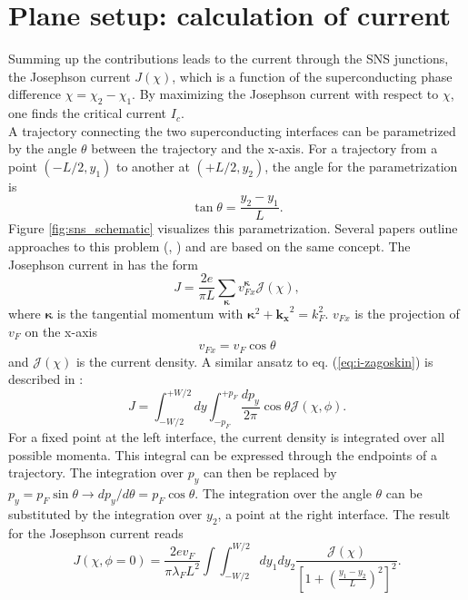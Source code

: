 \section{Plane setup: calculation of current}
Summing up the contributions leads to the current through the SNS junctions, the Josephson current $J\left( \chi \right)$, which is a function of the superconducting phase difference $\chi = \chi_2 - \chi_1$. By maximizing the Josephson current with respect to $\chi$, one finds the critical current $I_c$.\\
A trajectory connecting the two superconducting interfaces can be parametrized by the angle $\theta$ between the trajectory and the x-axis. For a trajectory from a point $(-L/2, y_1)$ to another at $(+L/2, y_2)$, the angle for the parametrization is
\begin{equation}
\tan \theta = \frac{y_2 - y_1}{L}.
\label{eq:parametrization}
\end{equation}
Figure \ref{fig:sns_schematic} visualizes this parametrization. 
Several papers outline approaches to this problem (\cite{Zagoskin1997}, \cite{Barzykin1999}) and are based on the same concept. The Josephson current in \cite{Zagoskin1997} has the form
\begin{equation}
J =  \frac{2 e }{\pi L} \sum_{\bm{\kappa}}v^{\bm{\kappa}}_{Fx} \mathcal{J} \left(\chi\right), \label{eq:i-zagoskin}
\end{equation}
where $\bm{\kappa}$ is the tangential momentum with $\bm{\kappa}^2 + \mathbf{k_x}^2 = k_F^2$.
$v_{Fx}$ is the projection of $v_F$ on the x-axis
\begin{equation}
v_{Fx} =  v_F  \cos \theta
\end{equation}
and $\mathcal{J} \left( \chi \right)$ is the current density. A similar ansatz to eq. (\ref{eq:i-zagoskin}) is described in \cite{Meier2016}:
\begin{equation}
J =  \int_{-W/2}^{+W/2} dy \int_{-p_F}^{+p_F} \frac{dp_y}{2 \pi} \cos \theta \mathcal{J} \left( \chi, \phi \right).
\end{equation}
For a fixed point at the left interface, the current density is integrated over all possible momenta. This integral can be expressed through the endpoints of a trajectory. The integration over $p_y$ can then be replaced by $p_y = p_F \sin \theta \rightarrow d p_y/d\theta = p_F \cos \theta$. The integration over the angle $\theta$ can be substituted by the integration over $y_2$, a point at the right interface. The result for the Josephson current reads
\begin{equation}
J\left(\chi, \phi=0\right) = \frac{2 e v_F}{\pi \lambda_F L^2}  \int \int_{-W/2}^{W/2} d y_1 d y_2 \frac{\mathcal{J}(\chi)}{\left[ 1 + \left(\frac{y_1 - y_2}{L}\right)^2\right]^2}.
\label{eq:josephson_current_zero_b}
\end{equation}
